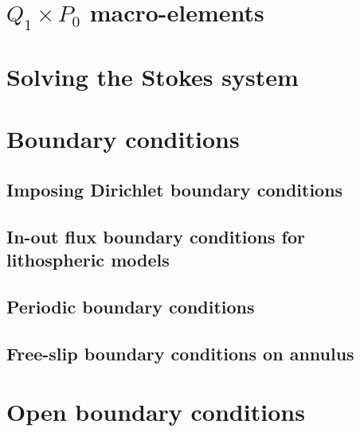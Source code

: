 \newpage %
\section{$Q_1\times P_0$ macro-elements} \label{ss:meshtopos}  %

\newpage %
\section{Solving the Stokes system \label{sec:solvers}}  %

\newpage %
\section{Boundary conditions}
\subsection{Imposing Dirichlet boundary conditions \label{ss:howtobc}}  %
\newpage %
\subsection{In-out flux boundary conditions for lithospheric models}\label{kin_bc}  
\newpage %
\subsection{Periodic boundary conditions\label{ss_periodic}} %
\newpage %
\subsection{Free-slip boundary conditions on annulus}\label{ss:fsbc_annulus} %

\newpage %
\section{Open boundary conditions}\label{ss:openbc} %

